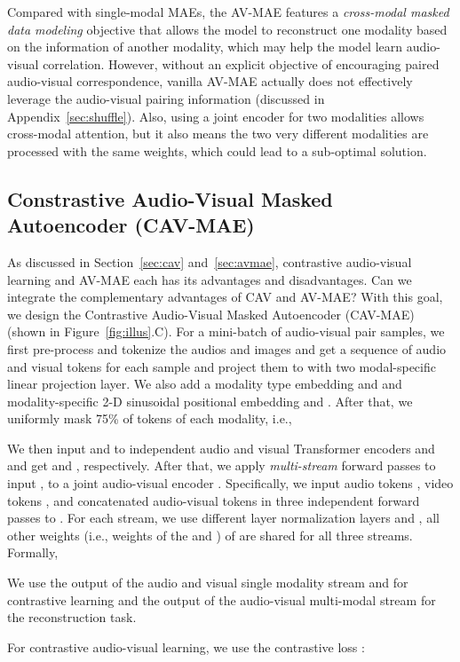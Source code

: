 \documentclass{article} \usepackage{iclr2023_conference,times}
\begin{document}
Compared with single-modal MAEs, the AV-MAE features a \emph{cross-modal masked data modeling} objective that allows the model to reconstruct one modality based on the information of another modality, which may help the model learn audio-visual correlation. However, without an explicit objective of encouraging paired audio-visual correspondence, vanilla AV-MAE actually does not effectively leverage the audio-visual pairing information (discussed in Appendix~\ref{sec:shuffle}). Also, using a joint encoder for two modalities allows cross-modal attention, but it also means the two very different modalities are processed with the same weights, which could lead to a sub-optimal solution.

\subsection{Constrastive Audio-Visual Masked Autoencoder (CAV-MAE)}
\label{sec:cavmae}

As discussed in Section~\ref{sec:cav} and~\ref{sec:avmae}, contrastive audio-visual learning and AV-MAE each has its advantages and disadvantages. Can we integrate the complementary advantages of CAV and AV-MAE? With this goal, we design the Contrastive Audio-Visual Masked Autoencoder (CAV-MAE) (shown in Figure~\ref{fig:illus}.C). For a mini-batch of  audio-visual pair samples, we first pre-process and tokenize the audios and images and get a sequence of audio and visual tokens  for each sample  and project them to  with two modal-specific linear projection layer. We also add a modality type embedding  and  and modality-specific 2-D sinusoidal positional embedding  and . After that, we uniformly mask 75\% of tokens of each modality, i.e.,

We then input  and  to independent audio and visual Transformer encoders  and  and get  and , respectively. After that, we apply \emph{multi-stream} forward passes to input ,  to a joint audio-visual encoder . Specifically, we input audio tokens , video tokens , and concatenated audio-visual tokens  in three independent forward passes to . For each stream, we use different layer normalization layers  and , all other weights (i.e., weights of the  and ) of  are shared for all three streams. Formally, 

We use the output of the audio and visual single modality stream  and  for contrastive learning and the output of the audio-visual multi-modal stream  for the reconstruction task. 

For contrastive audio-visual learning, we use the contrastive loss :
\end{document}

